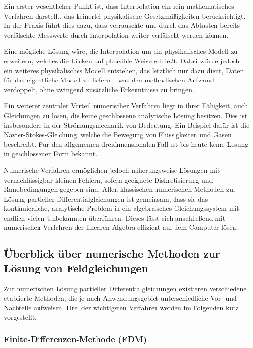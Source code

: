 Ein erster wesentlicher Punkt ist, dass Interpolation ein rein mathematisches Verfahren darstellt, das keinerlei physikalische Gesetzmäßigkeiten berücksichtigt.
In der Praxis führt dies dazu, dass verrauschte und durch das Abtasten bereits verfälschte Messwerte durch Interpolation weiter verfälscht werden können.

Eine mögliche Lösung wäre, die Interpolation um ein physikalisches Modell zu erweitern, welches die Lücken auf plausible Weise schließt.
Dabei würde jedoch ein weiteres physikalisches Modell entstehen, das letztlich nur dazu dient, Daten für das eigentliche Modell zu liefern – was den methodischen Aufwand verdoppelt, ohne zwingend zusätzliche Erkenntnisse zu bringen.

Ein weiterer zentraler Vorteil numerischer Verfahren liegt in ihrer Fähigkeit, auch Gleichungen zu lösen, die keine geschlossene analytische Lösung besitzen.
Dies ist insbesondere in der Strömungsmechanik von Bedeutung.
Ein Beispiel dafür ist die Navier-Stokes-Gleichung, welche die Bewegung von Flüssigkeiten und Gasen beschreibt.
Für den allgemeinen dreidimensionalen Fall ist bis heute keine Lösung in geschlossener Form bekannt.

Numerische Verfahren ermöglichen jedoch näherungsweise Lösungen mit vernachlässigbar kleinen Fehlern, sofern geeignete Diskretisierung und Randbedingungen gegeben sind.
Allen klassischen numerischen Methoden zur Lösung partieller Differentialgleichungen ist gemeinsam, dass sie das kontinuierliche, analytische Problem in ein algebraisches Gleichungssystem mit endlich vielen Unbekannten überführen.
Dieses lässt sich anschließend mit numerischen Verfahren der linearen Algebra effizient auf dem Computer lösen.

\subsection{Überblick über numerische Methoden zur Lösung von Feldgleichungen}

Zur numerischen Lösung partieller Differentialgleichungen existieren verschiedene etablierte Methoden, die je nach Anwendungsgebiet unterschiedliche Vor- und Nachteile aufweisen.
Drei der wichtigsten Verfahren werden im Folgenden kurz vorgestellt.

\subsubsection{Finite-Differenzen-Methode (FDM)}
\label{parallelisierung:section:fdm}

